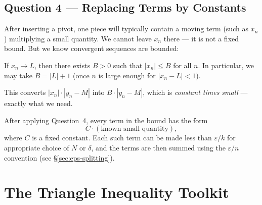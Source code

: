 \subsection{Question 4 — Replacing Terms by Constants}

After inserting a pivot, one piece will typically contain a moving term
(such as $x_n$) multiplying a small quantity.
We cannot leave $x_n$ there — it is not a fixed bound.
But we know convergent sequences are bounded:

\begin{tcolorbox}[colback=thmbox, colframe=thmborder, arc=2pt,
  left=8pt, right=8pt, top=6pt, bottom=6pt,
  title={\small\textbf{Boundedness of Convergent Sequences}},
  fonttitle=\small\bfseries]
If $x_n \to L$, then there exists $B > 0$ such that $|x_n| \le B$
for all $n$.
In particular, we may take $B = |L| + 1$ (once $n$ is large enough
for $|x_n - L| < 1$).
\end{tcolorbox}

\medskip

This converts $|x_n| \cdot |y_n - M|$ into $B \cdot |y_n - M|$,
which is \emph{constant times small} — exactly what we need.

\begin{remark*}
After applying Question~4, every term in the bound has the form
\[
  C \cdot (\text{known small quantity}),
\]
where $C$ is a fixed constant.
Each such term can be made less than $\varepsilon/k$ for appropriate
choice of $N$ or $\delta$, and the terms are then summed using
the $\varepsilon/n$ convention (see \S\ref{sec:eps-splitting}).
\end{remark*}

\clearpage


\section{The Triangle Inequality Toolkit}
\label{sec:ti-toolkit}

